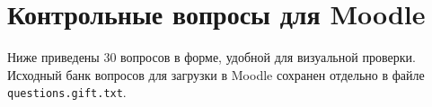 \section{Контрольные вопросы для Moodle}

Ниже приведены 30 вопросов в форме, удобной для визуальной проверки. Исходный банк вопросов для загрузки в Moodle сохранен отдельно в файле \texttt{questions.gift.txt}.


